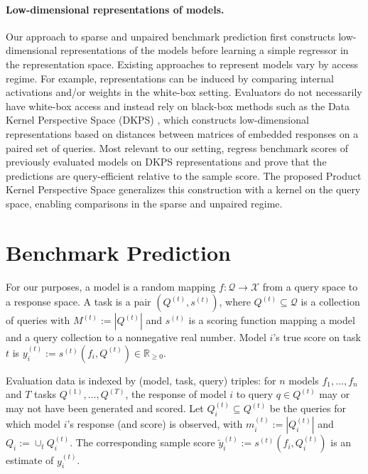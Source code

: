 \documentclass{article}
\theoremstyle{definition}
\theoremstyle{remark}
\theoremstyle{plain}
\begin{document}
\paragraph{Low-dimensional representations of models.}
Our approach to sparse and unpaired benchmark prediction first constructs low-dimensional representations of the models before learning a simple regressor in the representation space.
Existing approaches to represent models vary by access regime.
For example, representations can be induced by comparing internal activations
\citep{duderstadt2023comparing, huh2024platonic} and/or weights
\citep{chen2025weights} in the white-box setting.
Evaluators do not necessarily have white-box access and instead rely on black-box methods such as
the Data Kernel Perspective Space (DKPS) \citep{helm2024tracking,helm2025inference}, which constructs low-dimensional representations based on distances between matrices of embedded responses on a paired set of queries.
Most relevant to our setting, \citet{dkps_qeff} regress benchmark scores of
previously evaluated models on DKPS representations and prove that the predictions are query-efficient relative to the sample score.
The proposed Product Kernel Perspective Space generalizes this construction with a kernel on the query space, enabling comparisons in the sparse and unpaired regime.

\section{Benchmark Prediction}
\label{sec:setting}
For our purposes, a model is a random mapping
$f:\mathcal{Q}\to\mathcal{X}$ from a query space to a response space.
A task is a pair $(Q^{(t)}, s^{(t)})$, where $Q^{(t)}\subseteq\mathcal{Q}$ is a
collection of queries with $M^{(t)}:=|Q^{(t)}|$ and $s^{(t)}$ is a scoring function
mapping a model and a query collection to a nonnegative real number. 
Model $i$'s true score on task
$t$ is $y_i^{(t)}:=s^{(t)}(f_{i},Q^{(t)}) \in \mathbb{R}_{\ge 0}$.

Evaluation data is indexed by (model, task, query) triples: for $n$ models
$f_1,\dots,f_n$ and $T$ tasks $Q^{(1)},\dots,Q^{(T)}$, the response of model $i$ to
query $q\in Q^{(t)}$ may or may not have been generated and scored.
Let $Q_{i}^{(t)}\subseteq Q^{(t)}$ be the queries for which model $i$'s response (and score) is
observed, with $m_{i}^{(t)}:=|Q^{(t)}_{i}|$ and $Q_i:=\cup_{t}Q_i^{(t)}$.
The corresponding sample score
$\tilde{y}_{i}^{(t)}:=s^{(t)}(f_{i},Q_{i}^{(t)})$ is an estimate of
$y_{i}^{(t)}$.
\end{document}
